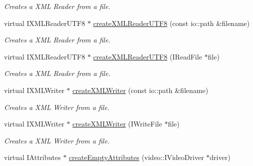 \begin{DoxyCompactItemize}
\begin{DoxyCompactList}\small\item\em Creates a X\-M\-L Reader from a file. \end{DoxyCompactList}\item 
\hypertarget{classirr_1_1io_1_1_c_file_system_aa32b93c33d5ce4ba6174b09938c09e02}{virtual I\-X\-M\-L\-Reader\-U\-T\-F8 $\ast$ \hyperlink{classirr_1_1io_1_1_c_file_system_aa32b93c33d5ce4ba6174b09938c09e02}{create\-X\-M\-L\-Reader\-U\-T\-F8} (const io\-::path \&filename)}\label{classirr_1_1io_1_1_c_file_system_aa32b93c33d5ce4ba6174b09938c09e02}

\begin{DoxyCompactList}\small\item\em Creates a X\-M\-L Reader from a file. \end{DoxyCompactList}\item 
\hypertarget{classirr_1_1io_1_1_c_file_system_a93f021cde40811c8b2e9239ccb1db6b1}{virtual I\-X\-M\-L\-Reader\-U\-T\-F8 $\ast$ \hyperlink{classirr_1_1io_1_1_c_file_system_a93f021cde40811c8b2e9239ccb1db6b1}{create\-X\-M\-L\-Reader\-U\-T\-F8} (I\-Read\-File $\ast$file)}\label{classirr_1_1io_1_1_c_file_system_a93f021cde40811c8b2e9239ccb1db6b1}

\begin{DoxyCompactList}\small\item\em Creates a X\-M\-L Reader from a file. \end{DoxyCompactList}\item 
\hypertarget{classirr_1_1io_1_1_c_file_system_a23e96a4ff77771eb15a59d4c3dcf5fbf}{virtual I\-X\-M\-L\-Writer $\ast$ \hyperlink{classirr_1_1io_1_1_c_file_system_a23e96a4ff77771eb15a59d4c3dcf5fbf}{create\-X\-M\-L\-Writer} (const io\-::path \&filename)}\label{classirr_1_1io_1_1_c_file_system_a23e96a4ff77771eb15a59d4c3dcf5fbf}

\begin{DoxyCompactList}\small\item\em Creates a X\-M\-L Writer from a file. \end{DoxyCompactList}\item 
\hypertarget{classirr_1_1io_1_1_c_file_system_a078d2b82d731777201fcb0bb524ba047}{virtual I\-X\-M\-L\-Writer $\ast$ \hyperlink{classirr_1_1io_1_1_c_file_system_a078d2b82d731777201fcb0bb524ba047}{create\-X\-M\-L\-Writer} (I\-Write\-File $\ast$file)}\label{classirr_1_1io_1_1_c_file_system_a078d2b82d731777201fcb0bb524ba047}

\begin{DoxyCompactList}\small\item\em Creates a X\-M\-L Writer from a file. \end{DoxyCompactList}\item 
\hypertarget{classirr_1_1io_1_1_c_file_system_a6bba814972ef5c13488ad73dd7f77537}{virtual I\-Attributes $\ast$ \hyperlink{classirr_1_1io_1_1_c_file_system_a6bba814972ef5c13488ad73dd7f77537}{create\-Empty\-Attributes} (video\-::\-I\-Video\-Driver $\ast$driver)}\label{classirr_1_1io_1_1_c_file_system_a6bba814972ef5c13488ad73dd7f77537}


\end{DoxyCompactItemize}
